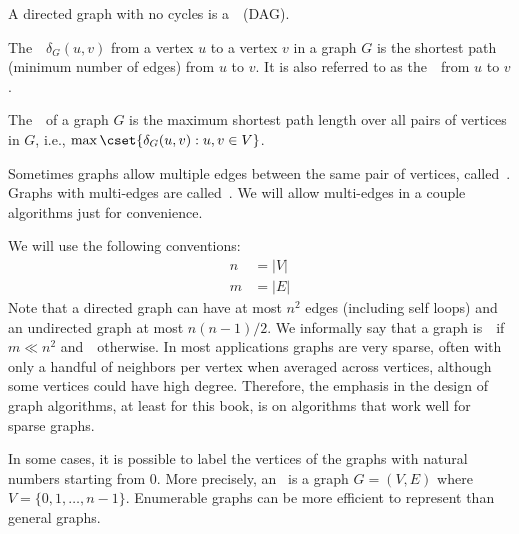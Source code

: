 \begin{definition}
A directed graph with no cycles is a~~(DAG).
\end{definition}

\begin{definition}[Distance]
The~~$\delta_G(u,v)$ from a vertex $u$ to a vertex $v$
in a graph $G$ is the shortest path (minimum number of edges) from $u$
to $v$.  It is also referred to as the~~from $u$ to $v$.
\end{definition}

\begin{definition}[Diameter]
The~~of a graph $G$ is the maximum shortest path length over all
pairs of vertices in $G$, i.e., $\max\cset{\delta_G(u,v) : u, v \in V}$.
\end{definition}

\begin{definition}[Multigraphs]
Sometimes graphs allow multiple edges between the same pair of
vertices, called~.  Graphs with multi-edges are
called~.  We will allow multi-edges in a couple
algorithms just for convenience.
\end{definition}

\begin{definition}
We will use the following conventions:
\begin{eqnarray*}
n & = |V|\\
m & = |E|
\end{eqnarray*}
Note that a directed graph can have at most $n^2$ edges (including self loops)
and an undirected graph at most $n(n-1)/2$.  We informally say that a graph
is~~if $m \ll n^2$ and~~otherwise.  In most
applications graphs are very sparse, often with only a handful of neighbors per
vertex when averaged across vertices, although some vertices could have high
degree.  Therefore, the emphasis in the design of graph algorithms, at least for
this book, is on algorithms that work well for sparse graphs.
\end{definition}

\begin{definition}
\label{def:bg::graphs::basics::enumerable}
In some cases, it is possible to label the vertices of the graphs with
natural numbers starting from $0$.  More precisely, an~ is a graph $G = (V,E)$ where $V =
\{0,1,\ldots,n-1\}$.
%
Enumerable graphs can be more efficient to represent than
general graphs.
\end{definition}

